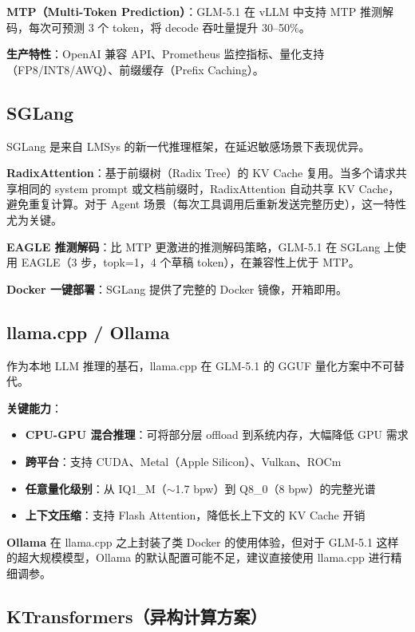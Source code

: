 \documentclass[UTF8,a4paper,10pt,oneside]{ctexart}
\begin{document}
\textbf{MTP（Multi-Token Prediction）}：GLM-5.1 在 vLLM 中支持 MTP 推测解码，每次可预测 3 个 token，将 decode 吞吐量提升 30--50\%。

\textbf{生产特性}：OpenAI 兼容 API、Prometheus 监控指标、量化支持（FP8/INT8/AWQ）、前缀缓存（Prefix Caching）。

\subsection{SGLang}

SGLang 是来自 LMSys 的新一代推理框架，在延迟敏感场景下表现优异。

\textbf{RadixAttention}：基于前缀树（Radix Tree）的 KV Cache 复用。当多个请求共享相同的 system prompt 或文档前缀时，RadixAttention 自动共享 KV Cache，避免重复计算。对于 Agent 场景（每次工具调用后重新发送完整历史），这一特性尤为关键。

\textbf{EAGLE 推测解码}：比 MTP 更激进的推测解码策略，GLM-5.1 在 SGLang 上使用 EAGLE（3 步，topk=1，4 个草稿 token），在兼容性上优于 MTP。

\textbf{Docker 一键部署}：SGLang 提供了完整的 Docker 镜像，开箱即用。

\subsection{llama.cpp / Ollama}

作为本地 LLM 推理的基石，llama.cpp 在 GLM-5.1 的 GGUF 量化方案中不可替代。

\textbf{关键能力}：
\begin{itemize}
    \item \textbf{CPU-GPU 混合推理}：可将部分层 offload 到系统内存，大幅降低 GPU 需求
    \item \textbf{跨平台}：支持 CUDA、Metal（Apple Silicon）、Vulkan、ROCm
    \item \textbf{任意量化级别}：从 IQ1\_M（$\sim$1.7 bpw）到 Q8\_0（8 bpw）的完整光谱
    \item \textbf{上下文压缩}：支持 Flash Attention，降低长上下文的 KV Cache 开销
\end{itemize}

\textbf{Ollama} 在 llama.cpp 之上封装了类 Docker 的使用体验，但对于 GLM-5.1 这样的超大规模模型，Ollama 的默认配置可能不足，建议直接使用 llama.cpp 进行精细调参。

\subsection{KTransformers（异构计算方案）}
\end{document}
